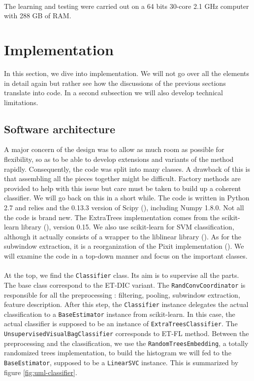 \documentclass[a4paper]{report}
\begin{document}
	\paragraph{}
	The learning and testing were carried out on a 64 bits 30-core 2.1 GHz computer with 288 GB of RAM. %
	
	
	\section{Implementation}
	In this section, we dive into implementation. We will not go over all the elements in detail again but rather see how the discussions of the previous sections translate into code. In a second subsection we will also develop technical limitations.
		\subsection{Software architecture}
		A major concern of the design was to allow as much room as possible for flexibility, so as to be able to develop extensions and variants of the method rapidly. Consequently, the code was split into many classes. A drawback of this is that assembling all the pieces together might be difficult. Factory methods are provided to help with this issue but care must be taken to build up a coherent classifier. We will go back on this in a short while. 
		The code is written in Python 2.7 and relies and the 0.13.3 version of Scipy (\cite{scipy}), including Numpy 1.8.0. Not all the code is brand new. The ExtraTrees implementation comes from the scikit-learn library (\cite{sklearn}), version 0.15. We also use scikit-learn for SVM classification, although it actually consists of a wrapper to the liblinear library (\cite{}). As for the subwindow extraction, it is a reorganization of the Pixit implementation (\cite{}).
		We will examine the code in a top-down manner and focus on the important classes.
		\paragraph{}
		At the top, we find the \texttt{Classifier} class. Its aim is to supervise all the parts. The base class correspond to the ET-DIC variant. The \texttt{RandConvCoordinator} is responsible for all the preprocessing : filtering, pooling, subwindow extraction, feature description. After this step, the \texttt{Classifier} instance delegates the actual classification to a \texttt{BaseEstimator} instance from scikit-learn. In this case, the actual classifier is supposed to be an instance of \texttt{ExtraTreesClassifier}. The \texttt{UnsupervisedVisualBagClassifier} corresponds to ET-FL method. Between the preprocessing and the classification, we use the \texttt{RandomTreesEmbedding}, a totally randomized trees implementation, to build the histogram we will fed to the \texttt{BaseEstimator}, supposed to be a \texttt{LinearSVC} instance.
		This is summarized by figure \ref{fig:uml-classifier}.
		
\end{document}
